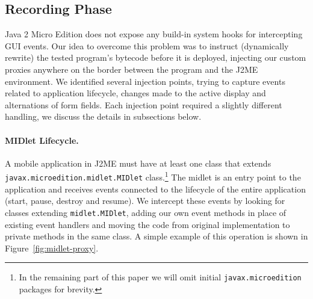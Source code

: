 \documentclass[a4paper,10pt,oneside,final]{dweiss-technote}
\renewcommand{\textsc}[1]{{\scriptsize \MakeUppercase{#1}}}
\newcommand{\jme}{\textsc{j2me}}
\begin{document}
\subsection{Recording Phase}

Java 2 Micro Edition does not expose any build-in system hooks for intercepting \textsc{gui} events.
Our idea to overcome this problem was to instruct (dynamically rewrite) the tested program's
bytecode before it is deployed, injecting our custom proxies anywhere on the border between the
program and the \jme{} environment. We identified several injection points, trying to capture events
related to application lifecycle, changes made to the active display and alternations of form
fields. Each injection point required a slightly different handling, we discuss the details in 
subsections below.

\paragraph*{MIDlet Lifecycle.} A mobile application in \jme{} must have at least one class that
extends \texttt{javax.\-microedition.\-midlet.\-MIDlet} class.\footnote{In the remaining part of
this paper we will omit initial \texttt{javax.microedition} packages for brevity.} The midlet is an
entry point to the application and receives events connected to the lifecycle of the entire
application (start, pause, destroy and resume). We intercept these events by looking for classes
extending \texttt{midlet.MIDlet}, adding our own event methods in place of existing event handlers
and moving the code from original implementation to private methods in the same class. A simple
example of this operation is shown in Figure~\ref{fig:midlet-proxy}.
\end{document}
